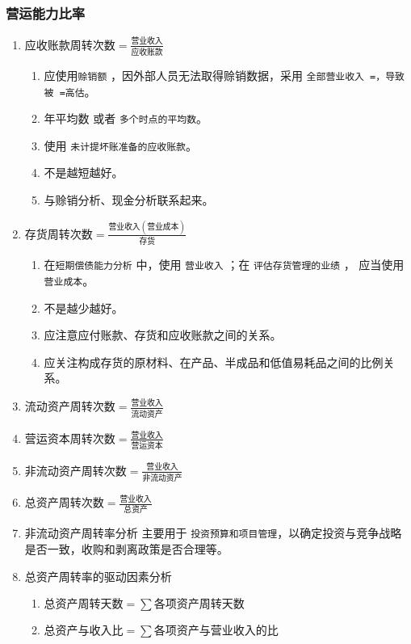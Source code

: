 \documentclass[11pt]{article}
\begin{document}
\subsubsection{营运能力比率}
\label{sec:org17fd37f}
\begin{enumerate}
\item \(应收账款周转次数 = \frac{营业收入}{应收账款}\)
\label{sec:org041c94a}
\begin{enumerate}
\item 应使用\texttt{赊销额} ，因外部人员无法取得赊销数据，采用 \texttt{全部营业收入 =，导致被 =高估}。
\item 年平均数 或者 \texttt{多个时点的平均数}。
\item 使用 \texttt{未计提坏账准备的应收账款}。
\item 不是越短越好。
\item 与赊销分析、现金分析联系起来。
\end{enumerate}
\item \(存货周转次数 =\frac{营业收入(营业成本)}{存货}\)
\label{sec:orgaad15d6}
\begin{enumerate}
\item 在\texttt{短期偿债能力分析} 中，使用 \texttt{营业收入} ；在 \texttt{评估存货管理的业绩} ， 应当使用 \texttt{营业成本}。
\item 不是越少越好。
\item 应注意应付账款、存货和应收账款之间的关系。
\item 应关注构成存货的原材料、在产品、半成品和低值易耗品之间的比例关系。
\end{enumerate}
\item \(流动资产周转次数 = \frac{营业收入}{流动资产}\)
\label{sec:orge0f7d22}
\item \(营运资本周转次数 = \frac{营业收入}{营运资本}\)
\label{sec:org8a1aea4}
\item \(非流动资产周转次数 = \frac{营业收入}{非流动资产}\)
\label{sec:orgd1d2c4e}
\item \(总资产周转次数 = \frac{营业收入}{总资产}\)
\label{sec:org21eff7d}
\item 非流动资产周转率分析
\label{sec:orge43c50a}
主要用于 \texttt{投资预算和项目管理}，以确定投资与竞争战略是否一致，收购和剥离政策是否合理等。
\item 总资产周转率的驱动因素分析
\label{sec:orgfb0986a}
\begin{enumerate}
\item \(总资产周转天数=\sum 各项资产周转天数\)
\item \(总资产与收入比=\sum 各项资产与营业收入的比\)
\end{enumerate}
\end{enumerate}
\end{document}
